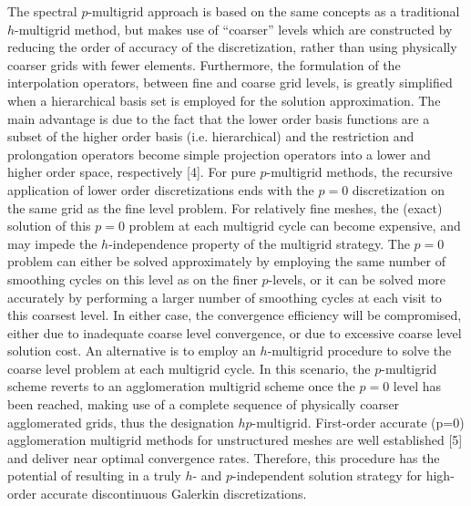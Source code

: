\documentclass{report}
\begin{document}
The spectral $p$-multigrid approach is based on the same concepts as a
traditional $h$-multigrid method, but makes use of ``coarser'' levels
which are constructed by reducing the order of accuracy of the
discretization, rather than using physically coarser grids with fewer
elements. Furthermore, the formulation of the interpolation operators,
between fine and coarse grid levels, is greatly simplified when a
hierarchical basis set is employed for the solution approximation. The
main advantage is due to the fact that the lower order basis functions
are a subset of the higher order basis (i.e. hierarchical) and the
restriction and prolongation operators become simple projection
operators into a lower and higher order space, respectively [4]. For
pure $p$-multigrid methods, the recursive application of lower order
discretizations ends with the $p=0$ discretization on the same grid as
the fine level problem. For relatively fine meshes, the (exact)
solution of this $p=0$ problem at each multigrid cycle can become
expensive, and may impede the $h$-independence property of the multigrid
strategy. The $p=0$ problem can either be solved approximately by
employing the same number of smoothing cycles on this level as on the
finer $p$-levels, or it can be solved more accurately by performing a
larger number of smoothing cycles at each visit to this coarsest level.
In either case, the convergence efficiency will be compromised, either
due to inadequate coarse level convergence, or due to excessive coarse
level solution cost. An alternative is to employ an $h$-multigrid
procedure to solve the coarse level problem at each multigrid cycle. In
this scenario, the $p$-multigrid scheme reverts to an agglomeration
multigrid scheme once the $p=0$ level has been reached, making use of a
complete sequence of physically coarser agglomerated grids, thus the
designation $hp$-multigrid. First-order accurate (p=0) agglomeration
multigrid methods for unstructured meshes are well established [5] and
deliver near optimal convergence rates. Therefore, this procedure has
the potential of resulting in a truly $h$- and $p$-independent solution
strategy for high-order accurate discontinuous Galerkin
discretizations.
\end{document}
